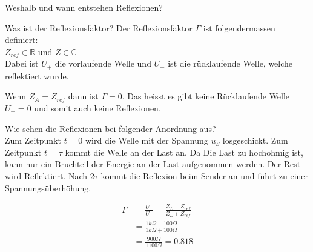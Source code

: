 \begin{karte}{Weshalb und wann entstehen Reflexionen?}
\end{karte}

\begin{karte}{Was ist der Reflexionsfaktor?}
	Der Reflexionsfaktor $\Gamma$ ist folgendermassen definiert:\\
	 \quad $Z_{ref} \in \mathbb{R}$ und $Z \in \mathbb{C}$\\[5pt]
	Dabei ist $U_+$ die vorlaufende Welle und $U_-$ ist die rücklaufende Welle, welche reflektiert wurde.\\
	\begin{minipage}{0.49\textwidth}
		\scalebox{.7}{}
	\end{minipage}
	\begin{minipage}{0.49\textwidth}
		Wenn $Z_A = Z_{ref}$ dann ist $\Gamma = 0$. Das heisst es gibt keine Rücklaufende Welle $U_- = 0$ und somit auch keine Reflexionen.
	\end{minipage}
	
\end{karte}

\begin{karte}{Wie sehen die Reflexionen bei folgender Anordnung aus?\\
	\scalebox{.8}{}}
	Zum Zeitpunkt $t=0$ wird die Welle mit der Spannung $u_S$ losgeschickt. Zum Zeitpunkt $t=\tau$ kommt die Welle an der Last an. Da Die Last zu hochohmig ist, kann nur ein Bruchteil der Energie an der Last aufgenommen werden. Der Rest wird Reflektiert. Nach $2\tau$ kommt die Reflexion beim Sender an und führt zu einer Spannungsüberhöhung.\\
	\begin{minipage}{0.59\textwidth}
		\scalebox{.75}{}
	\end{minipage}
	\begin{minipage}{0.39\textwidth}
		\begin{align*}
			\Gamma &= \frac{U_-}{U_+} = \frac{Z_L-Z_{ref}}{Z_L+Z_{ref}}\\
			&= \frac{1k\Omega-100\Omega}{1k\Omega+100\Omega}\\
			&= \frac{900\Omega}{1100\Omega} = 0.818
		\end{align*}
	\end{minipage}
\end{karte}

